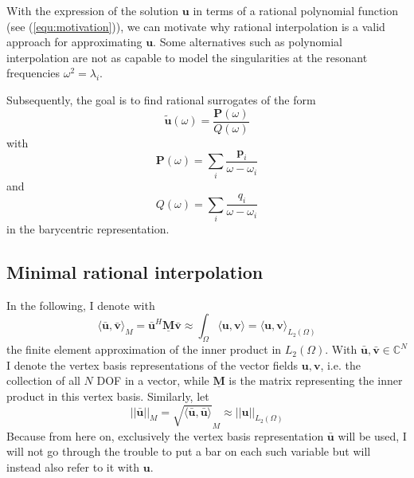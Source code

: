\documentclass[11pt, a4paper]{article}
\begin{document}
With the expression of the solution $\mathbf{u}$ in terms of a rational polynomial
function (see (\ref{equ:motivation})), we can motivate why rational interpolation
is a valid approach for approximating $\mathbf{u}$. Some alternatives such as polynomial
interpolation are not as capable to model the singularities at the resonant
frequencies $\omega^2 = \lambda_i$.

Subsequently, the goal is to find rational surrogates of the form
\begin{equation}
    \mathbf{\tilde{u}}(\omega) = \frac{\mathbf{P}(\omega)}{Q(\omega)} \label{equ:surrogate}
\end{equation}
with
\begin{equation}
    \mathbf{P}(\omega) = \sum_i \frac{\mathbf{p}_i}{\omega - \omega_i}
\end{equation}
and
\begin{equation}
    Q(\omega) = \sum_i \frac{q_i}{\omega - \omega_i} \label{equ:surrogate-denominator}
\end{equation}
in the barycentric representation.

\subsection{Minimal rational interpolation}
\label{subsec:MRI}

In the following, I denote with
\begin{equation}
    \langle \mathbf{\bar{u}}, \mathbf{\bar{v}} \rangle_M = \mathbf{\bar{u}}^H \mathbf{\underline{M}} \mathbf{\bar{v}} \approx \int_{\Omega} \langle \mathbf{u}, \mathbf{v} \rangle = \langle \mathbf{u}, \mathbf{v} \rangle_{L_2(\Omega)} \label{equ:matrix-inner-product}
\end{equation}
the finite element approximation of the inner product in $L_2(\Omega)$.
With $\mathbf{\bar{u}}, \mathbf{\bar{v}} \in \mathbb{C}^N$ I denote the vertex basis
representations of the vector fields $\mathbf{u}, \mathbf{v}$,
i.e. the collection of all $N$ \acrfull{DOF} in a vector, while $\mathbf{\underline{M}}$
is the matrix representing the inner product in this vertex basis. Similarly, let
\begin{equation}
    ||\mathbf{\bar{u}}||_M = \sqrt{\langle \mathbf{\bar{u}}, \mathbf{\bar{u}} \rangle}_M \approx ||\mathbf{u}||_{L_2(\Omega)} \label{equ:matrix-norm}
\end{equation}
Because from here on, exclusively the vertex basis representation $\mathbf{\bar{u}}$
will be used, I will not go through the trouble to put a bar on each such variable
but will instead also refer to it with $\mathbf{u}$.
\end{document}

